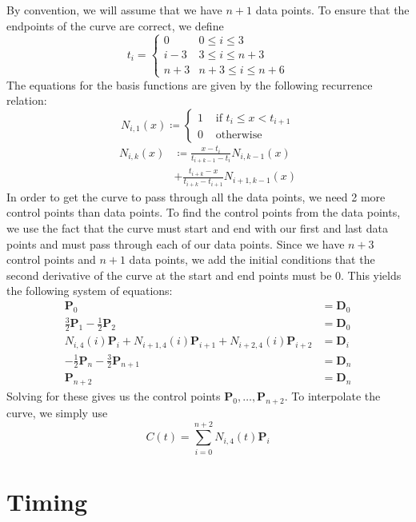 \documentclass[10pt]{article}
\begin{document}
\begin{multicols}{2}
  By convention, we will assume that we have $n+1$ data points. To ensure that
  the endpoints of the curve are correct, we define \[t_i = \begin{cases}
      0 & 0 \le i \le 3 \\
      i-3 & 3 \le i \le n+3 \\
      n+3 & n+3 \le i \le n+6
    \end{cases}
  \]
  The equations for the basis functions are given by the following recurrence
  relation: \cite{wiki:spline}
  \[N_{i,1}(x) \coloneqq \begin{cases}
      1 &\text{ if } t_i \le x < t_{i+1} \\
      0 &\text{ otherwise}
  \end{cases} \]
  \begin{align*}
    N_{i,k}(x) &\coloneqq \frac{x-t_i}{t_{i+k-1}-t_i} N_{i,k-1}(x) \\
    &+ \frac{t_{i+k}-x}{t_{i+k}-t_{i+1}} N_{i+1,k-1}(x)
  \end{align*}
  In order to get the curve to pass through all the data points, we need 2 more
  control points than data points. To find the control points from the data
  points, we use the fact that the curve must start and end with our first and
  last data points and must pass through each of our data points. Since we have
  $n+3$ control points and $n+1$ data points, we add the initial conditions that
  the second derivative of the curve at the start and end points must be 0. This
  yields the following system of equations:
  \begin{align*}
    \mathbf{P}_0 &= \mathbf{D}_0 \\
    \frac{3}{2} \mathbf{P}_1 - \frac{1}{2} \mathbf{P}_2 &= \mathbf{D}_0 \\
    N_{i,4}(i) \mathbf{P}_i + N_{i+1,4}(i) \mathbf{P}_{i+1} + N_{i+2,4}(i)
    \mathbf{P}_{i+2} &= \mathbf{D}_i \\
    -\frac{1}{2} \mathbf{P}_{n} - \frac{3}{2} \mathbf{P}_{n+1} &= \mathbf{D}_n \\
    \mathbf{P}_{n+2} &= \mathbf{D}_{n}
  \end{align*}
  Solving for these gives us the control points $\mathbf{P}_0, \dots,
  \mathbf{P}_{n+2}$. To interpolate the curve, we simply use
  \[C(t) = \sum_{i=0}^{n+2} N_{i,4}(t) \mathbf{P}_i\]

  \section*{Timing}


\end{multicols}
\end{document}

